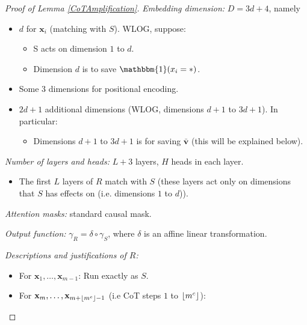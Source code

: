 \documentclass{article}
\theoremstyle{definition}
\DeclarePairedDelimiter{\floor}{\lfloor}{\rfloor}
\newcommand{\x}{\mathbf{x}}
\renewcommand{\v}{\mathbf{v}}
\newcommand{\0}{\mathbf{0}}
\newcommand{\1}{\mathbbm{1}}
\begin{document}
\begin{proof}[Proof of Lemma \ref{CoTAmplification}]
        {\em Embedding dimension:} $D = 3d+4$, namely 
        \begin{itemize} [noitemsep,leftmargin=10pt,topsep=0pt]
            \item $d$ for $\x_i$ (matching with $S$). WLOG, suppose: 
            \begin{itemize}
                \item S acts on dimension $1$ to $d$. 
                \item Dimension $d$ is to save $\1(x_i = *)$. 
            \end{itemize}
            \item Some 3 dimensions for positional encoding.
            \item $2d+1$ additional dimensions (WLOG, dimensions $d+1$ to $3d+1$). In particular: 
            \begin{itemize}[noitemsep,leftmargin=10pt]
                \item Dimensions $d+1$ to $3d+1$ is for saving $\bar{\v}$ (this will be explained below).
            \end{itemize}
        \end{itemize}
        
        {\em Number of layers and heads:} $L+3$ layers, $H$ heads in each layer. 
        \begin{itemize}[noitemsep, leftmargin=10pt,topsep=0pt]
            \item The first $L$ layers of $R$ match with $S$ (these layers act only on dimensions that $S$ has effects on (i.e. dimensions $1$ to $d$)). %
        \end{itemize}

        {\em Attention masks:} standard causal mask.

        {\em Output function:} $\gamma_R = \delta \circ \gamma_S$, where $\delta$ is an affine linear transformation. %

    {\em Descriptions and justifications of $R$: }
    \begin{itemize}[noitemsep,leftmargin=10pt,topsep=0pt]
        \item For $\x_1, \dots, \x_{m-1}$: Run exactly as $S$. 

        \item For $\x_m, \dots, \x_{m + \floor{m^c} -1}$ (i.e CoT steps $1$ to $\floor{m^c}$): 
        

\end{itemize}
\end{proof}
\end{document}
